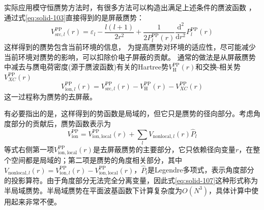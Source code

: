 {实际应用模守恒赝势方法时，有很多方法可以构造出满足上述条件的赝波函数%
，%
通过式\eqref{eq:solid-103}直接得到的是屏蔽赝势：
\begin{equation}
	V_{\mathrm{src},l}^{\mathrm{PP}}(r)=\varepsilon_l-\frac{l(l+1)}{2r^2}+\frac1{2P_l^{\mathrm{PP}}(r)}\frac{\mathrm{d}^2}{\mathrm{d}r^2}P_l^{\mathrm{PP}}(r)
  \label{eq:solid-106}
\end{equation}
这样得到的赝势包含当前环境的信息，%
为提高赝势对环境的适应性，尽可能减少当前环境对赝势的影响，可以扣除价电子屏蔽的贡献。%
通常的做法是从屏蔽赝势中减去与赝电荷密度(源于赝波函数)有关的Hartree势$V_{\mathrm{H}}^{\mathrm{PP}}(r)$和交换-相关势$V_{XC}^{\mathrm{PP}}(r)$%
$$V_{\mathrm{ion},l}^{\mathrm{PP}}(r)=V_{\mathrm{src},l}^{\mathrm{PP}}(r)-V_{\mathrm{H}}^{\mathrm{PP}}(r)-V_{XC}^{\mathrm{PP}}(r)$$
这一过程称为赝势的去屏蔽。

有必要指出的是，这样得到的势函数是局域的，但它只是赝势的径向部分。考虑角度部分的贡献后，赝势函数表示为
\begin{equation}
	V_{\mathrm{ion}}^{\mathrm{PP}}=V_{\mathrm{ion},\mathrm{local}}^{\mathrm{PP}}(r)+\sum_lV_{\mathrm{nonlocal},l}(r)\hat P_l
  \label{eq:solid-107}
\end{equation}
等式右侧第一项$V_{\mathrm{ion},\mathrm{local}}^{\mathrm{PP}}(r)$是去屏蔽赝势的主要部分，它只依赖径向变量$r$，在整个空间都是局域的；第二项是赝势的角度相关部分，其中$V_{\mathrm{nonlocal},l}(r)=V_{\mathrm{ion},l}^{\mathrm{PP}}(r)-V_{\mathrm{ion},\mathrm{local}}^{\mathrm{PP}}(r)$，$\hat P_l$是Legendre多项式，表示角度部分的投影算符。由于角度部分无法完全分离变量，因此式\eqref{eq:solid-107}这种形式称为半局域赝势。半局域赝势在平面波基函数下计算复杂度为$O(N^3)$，具体计算中使用起来非常不便。

}
